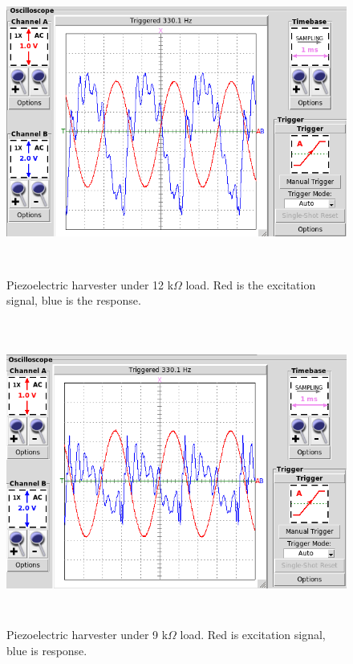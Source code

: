 \begin{figure}[htb]
\begin{center}
\includegraphics[height=10cm]{images/own_measurement/generator_shaker/piezo_td_12k_330hz_2_2.png}
\end{center}
\caption{\label{fig:piezo_td_12k} Piezoelectric harvester under 12 k$\Omega$ load. Red is the excitation signal, blue is the response.}
\end{figure}

\begin{figure}[htb]
\begin{center}
\includegraphics[height=10cm]{images/own_measurement/generator_shaker/piezo_td_9k_330hz_2_2.png}
\end{center}
\caption{\label{fig:piezo_td_9k} Piezoelectric harvester under 9 k$\Omega$ load. Red is excitation signal, blue is response.}
\end{figure}

